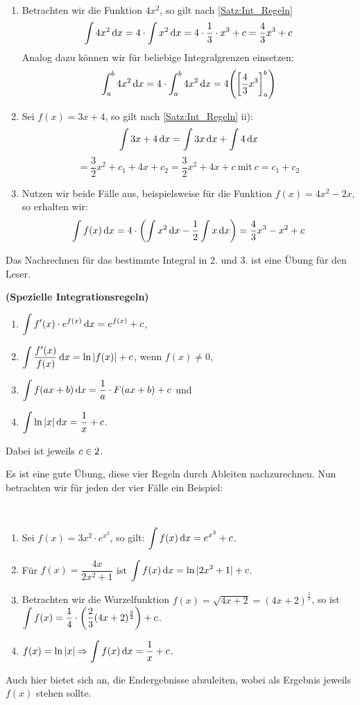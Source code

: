 \documentclass[ngerman, 12pt]{nssheetxea}
\begin{document}
\begin{example} \
\begin{enumerate}
\item Betrachten wir die Funktion $4x^2$, so gilt nach \ref{Satz:Int_Regeln}
\[ \int 4x^2 \mathop{}\!\mathrm{d} x = 4 \cdot \int x^2 \mathop{}\!\mathrm{d} x = 4 \cdot \dfrac{1}{3} \cdot x^3 +c = \dfrac{4}{3}x^3 +c \]
Analog dazu können wir für beliebige Integralgrenzen einsetzen:
\[ \int_a^b 4x^2 \diff x = 4 \cdot \int_a^b 4x^2 \diff x = 4 \mleft( \mleft[ \dfrac{4}{3}x^3  \mright]_a^b \mright)  \]
\item Sei $f(x)=3x+4$, so gilt nach \ref{Satz:Int_Regeln} ii):
\[ \int 3x+4 \mathop{}\!\mathrm{d} x = \int 3x \mathop{}\!\mathrm{d} x + \int 4 \mathop{}\!\mathrm{d} x \] \[ =\dfrac{3}{2}x^2 +c_1 +4x + c_2 = \dfrac{3}{2}x^2+4x+c \ \text{mit} \ c=c_1+c_2   \]
\item Nutzen wir beide Fälle aus, beispielsweise für die Funktion $f(x)=4x^2-2x$, so erhalten wir:
\[ \int f(x) \diff x = 4 \cdot \mleft( \int x^2 \diff x - \frac{1}{2} \int x \diff x \mright) = \dfrac{4}{3}x^3 - x^2 +c \]
\end{enumerate}
Das Nachrechnen für das bestimmte Integral in 2. und 3. ist eine Übung für den Leser.
\end{example}

\begin{theorem} \textbf{(Spezielle Integrationsregeln)}
\begin{enumerate}
	\item $\displaystyle \int f'(x) \cdot e^{f(x)} \mathop{}\!\mathrm{d} x=e^{f(x)}+c$,
	\item $\displaystyle \int \dfrac{f'(x)}{f(x)} \mathop{}\!\mathrm{d} x = \ln |f(x)| +c$, wenn $f(x)\neq 0$,
	\item $\displaystyle \int f(ax+b)\mathop{}\!\mathrm{d} x = \dfrac{1}{a}\cdot F(ax+b) +c$ und
	\item $\displaystyle \int \ln |x| \mathop{}\!\mathrm{d} x = \dfrac{1}{x}+c$.
\end{enumerate}
Dabei ist jeweils $c\in 2$.
\end{theorem}
Es ist eine gute Übung, diese vier Regeln durch Ableiten nachzurechnen. Nun betrachten wir für jeden der vier Fälle ein Beispiel:

\begin{example} \
\begin{enumerate}
\item Sei $f(x)=3x^2 \cdot e^{x^3}$, so gilt: $\displaystyle \int f(x) \mathop{}\!\mathrm{d} x = e^{x^3}+c$.
\item Für $f(x)=\dfrac{4x}{2x^2+1}$ ist $\displaystyle \int f(x) \mathop{}\!\mathrm{d} x = \ln |2x^2+1| +c$.
\item Betrachten wir die Wurzelfunktion $f(x)=\sqrt{4x+2}=(4x+2)^{\frac{1}{2}}$, so ist $\displaystyle \int f(x) = \dfrac{1}{4} \cdot \mleft( \dfrac{2}{3} (4x+2)^{\frac{3}{2}} \mright) +c$.
\item $\displaystyle f(x)=\ln|x| \Rightarrow \int f(x) \mathop{}\!\mathrm{d} x = \dfrac{1}{x} +c$.
\end{enumerate}
Auch hier bietet sich an, die Endergebnisse abzuleiten, wobei als Ergebnis jeweils $f(x)$ stehen sollte.
\end{example}
\end{document}
